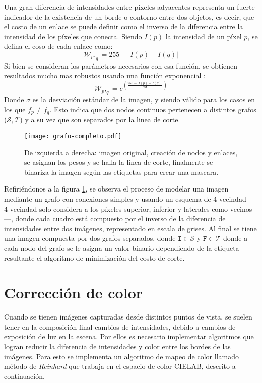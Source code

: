 Una gran diferencia de intensidades entre píxeles adyacentes representa un fuerte indicador de la existencia de un borde o contorno entre dos objetos, es decir, que el costo de un enlace se puede definir como el inverso de la diferencia entre la intensidad de los píxeles que conecta. Siendo $I(p)$ la intensidad de un píxel $p$, se defina el coso de cada enlace como:
\begin{equation}
\mathcal{W}_p,_q = 255 - |I(p) - I (q)|
\label{costo-corte}
\end{equation}
Si bien se consideran los parámetros necesarios con esa función, se obtienen resultados mucho mas robustos usando una función exponencial \cite{graph-opencv}:
\begin{equation}
\mathcal{W}_p,_q = e^{\left(\frac{255-|I(p) - I (q)|}{2 \sigma}  \right) }
\label{costo-corte}
\end{equation}
Donde $\sigma$ es la desviación estándar de la imagen, y siendo válido para los casos en los que $f_p \neq f_q$. Esto indica que dos nodos continuos pertenecen a distintos grafos ($\mathcal{S,T}$) y a su vez que son separados por la linea de corte.

\begin{figure}[h]
	\centering
	\texttt{[image: grafo-completo.pdf]}
	\caption[Corte por grafo]{De izquierda a derecha: imagen original, creación de nodos y enlaces, se asignan los pesos y se halla la linea de corte, finalmente se binariza la imagen según las etiquetas para crear una mascara.}
	\label{imagen:grafo}
\end{figure}

Refiriéndonos a la figura \ref{imagen:grafo}, se observa el proceso de modelar una imagen mediante un grafo con conexiones simples y usando un esquema de 4 vecindad --- 4 vecindad solo considera a los píxeles superior, inferior y laterales como vecinos ---, donde cada cuadro está compuesto por el inverso de la diferencia de intensidades entre dos imágenes, representado en escala de grises. Al final se tiene una imagen compuesta por dos grafos separados, donde $\mathtt{I} \in \mathcal{S}$ y $\mathtt{F} \in \mathcal{T}$ donde a cada nodo del grafo se le asigna un valor binario dependiendo de la etiqueta resultante el algoritmo de minimización del costo de corte.


\section{Corrección de color}
Cuando se tienen imágenes capturadas desde distintos puntos de vista, se suelen tener en la composición final cambios de intensidades, debido a cambios de exposición de luz en la escena. Por ellos es necesario implementar algoritmos que logran reducir la diferencia de intensidades y color entre los bordes de las imágenes. Para esto se implementa un algoritmo de mapeo de color llamado método de \textit{Reinhard} \cite{reinhard} que trabaja en el espacio de color CIELAB, descrito a continuación. 

